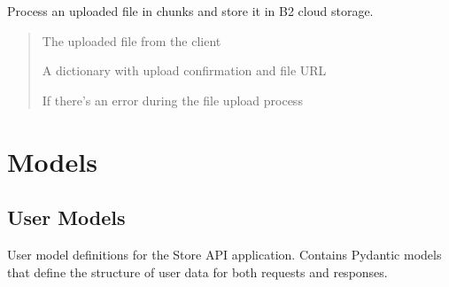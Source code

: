 \documentclass[letterpaper,10pt,openany,oneside,english]{sphinxmanual}
\begin{document}
\begin{savenotes}\begin{fulllineitems}
\label{\detokenize{modules/routers:storeapi.routers.upload.upload_file}}
\pysigstartsignatures
{}
\pysigstopsignatures
\sphinxAtStartPar
Process an uploaded file in chunks and store it in B2 cloud storage.
\begin{quote}\begin{description}
\sphinxAtStartPar
{} \textendash{} The uploaded file from the client

\sphinxAtStartPar
A dictionary with upload confirmation and file URL

\sphinxAtStartPar
{} \textendash{} If there’s an error during the file upload process

\end{description}\end{quote}

\end{fulllineitems}\end{savenotes}


\sphinxstepscope


\chapter{Models}
\label{\detokenize{modules/models:models}}\label{\detokenize{modules/models::doc}}

\section{User Models}
\label{\detokenize{modules/models:user-models}}
\sphinxAtStartPar
User model definitions for the Store API application.
Contains Pydantic models that define the structure of user data
for both requests and responses.
\end{document}
